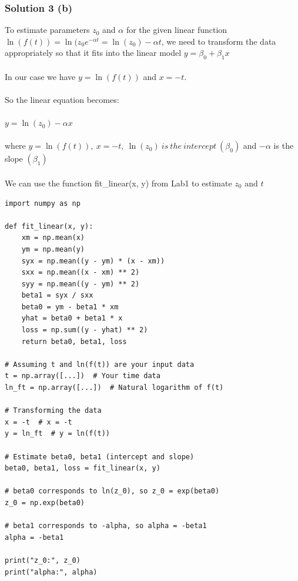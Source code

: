 \documentclass{assignment}
\begin{document}
\begin{problem}
\subsubsection*{Solution 3 (b)}
\noindent To estimate parameters $z_0$ and $\alpha$ for the given linear function $\ln(f(t)) = \ln(z_0e^{-\alpha t} = \ln(z_0) - \alpha t$, we need to transform the data appropriately so that it fits into the linear model $y = \beta_0 + \beta_1x$
\\
\\
In our case we have $y = \ln(f(t))$ and $x = -t$. 
\\
\\
So the linear equation becomes:\\ \\
$y = \ln(z_0) - \alpha x$ \\ \\ where $y = \ln(f(t)),\ x = -t,\ \ln(z_0)\ is\ the\ intercept\ (\beta_0)$ and $-\alpha$ is the slope $(\beta_1)$
\\
\\
We can use the function fit\_linear(x, y) from Lab1 to estimate $z_0$ and $t$
\\

\begin{lstlisting}
import numpy as np

def fit_linear(x, y):
    xm = np.mean(x)
    ym = np.mean(y)
    syx = np.mean((y - ym) * (x - xm))
    sxx = np.mean((x - xm) ** 2)
    syy = np.mean((y - ym) ** 2)
    beta1 = syx / sxx
    beta0 = ym - beta1 * xm
    yhat = beta0 + beta1 * x
    loss = np.sum((y - yhat) ** 2)
    return beta0, beta1, loss

# Assuming t and ln(f(t)) are your input data
t = np.array([...])  # Your time data
ln_ft = np.array([...])  # Natural logarithm of f(t)

# Transforming the data
x = -t  # x = -t
y = ln_ft  # y = ln(f(t))

# Estimate beta0, beta1 (intercept and slope)
beta0, beta1, loss = fit_linear(x, y)

# beta0 corresponds to ln(z_0), so z_0 = exp(beta0)
z_0 = np.exp(beta0)

# beta1 corresponds to -alpha, so alpha = -beta1
alpha = -beta1

print("z_0:", z_0)
print("alpha:", alpha)

\end{lstlisting}


\end{problem}
\end{document}
